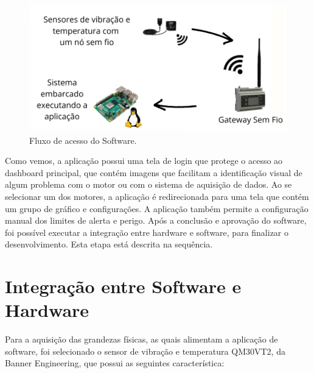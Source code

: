 \begin{figure}[H]
    \caption{Fluxo de acesso do Software.}
    \begin{center}
        \includegraphics[scale=0.8, page=2]{metodologia/img/fluxo_layout.pdf}
    \end{center}
    \label{fig:fluxo_software}
\end{figure}

Como vemos, a aplicação possui uma tela de login que protege o acesso ao dashboard principal, que contém imagens que facilitam a identificação
visual de algum problema com o motor ou com o sistema de aquisição de dados. Ao se selecionar um dos motores, a aplicação é redirecionada para
uma tela que contém um grupo de gráfico e configurações. A aplicação também permite a configuração manual dos limites de alerta e perigo.
Após a conclusão e aprovação do software, foi possível executar a integração entre hardware e software, para finalizar o desenvolvimento. Esta
etapa está descrita na sequência.

% 

\section{Integração entre Software e Hardware}

Para a aquisição das grandezas físicas, as quais alimentam a aplicação de software, foi selecionado o sensor de vibração e temperatura QM30VT2, 
da Banner Engineering, que possui as seguintes característica:

